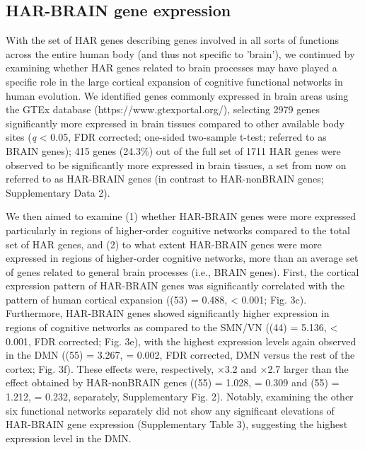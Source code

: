 \begin{refsection}
\subsection*{HAR-BRAIN gene expression}
With the set of HAR genes describing genes involved in all sorts of functions across the entire human body (and thus not specific to 'brain'), we continued by examining whether HAR genes related to brain processes may have played a specific role in the large cortical expansion of cognitive functional networks in human evolution. We identified genes commonly expressed in brain areas using the GTEx database (https://www.gtexportal.org/), selecting 2979 genes significantly more expressed in brain tissues compared to other available body sites (\textit{q} < 0.05, FDR corrected; one-sided two-sample t-test; referred to as BRAIN genes); 415 genes (24.3\%) out of the full set of 1711 HAR genes were observed to be significantly more expressed in brain tissues, a set from now on referred to as HAR-BRAIN genes (in contrast to HAR-nonBRAIN genes; Supplementary Data 2).

We then aimed to examine (1) whether HAR-BRAIN genes were more expressed particularly in regions of higher-order cognitive networks compared to the total set of HAR genes, and (2) to what extent HAR-BRAIN genes were more expressed in regions of higher-order cognitive networks, more than an average set of genes related to general brain processes (i.e., BRAIN genes). First, the cortical expression pattern of HAR-BRAIN genes was significantly correlated with the pattern of human cortical expansion (\rvaldf(53) = 0.488, \pval < 0.001; Fig. 3c). Furthermore, HAR-BRAIN genes showed significantly higher expression in regions of cognitive networks as compared to the SMN/VN (\tvaldf(44) = 5.136, \pval < 0.001, FDR corrected; Fig. 3e), with the highest expression levels again observed in the DMN (\tvaldf(55) = 3.267, \pval = 0.002, FDR corrected, DMN versus the rest of the cortex; Fig. 3f). These effects were, respectively, $\times$3.2 and $\times$2.7 larger than the effect obtained by HAR-nonBRAIN genes (\tval(55) = 1.028, \pval = 0.309 and \tvaldf(55) = 1.212, \pval = 0.232, separately, Supplementary Fig. 2). Notably, examining the other six functional networks separately did not show any significant elevations of HAR-BRAIN gene expression (Supplementary Table 3), suggesting the highest expression level in the DMN.


\end{refsection}
